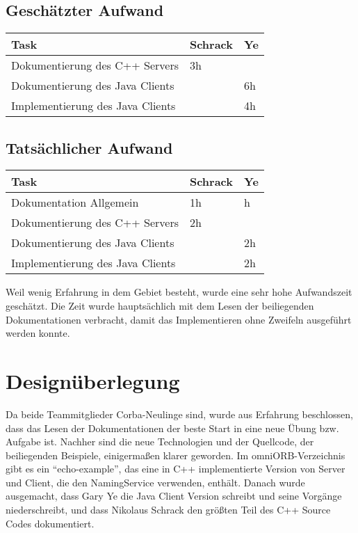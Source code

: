 \documentclass[11pt]{article}
\begin{document}
\subsection{Geschätzter Aufwand}

\begin{center}
  \begin{tabular}{| l | l | l |}
    \hline
    Task & Schrack & Ye \\ \hline

    Dokumentierung des C++ Servers   & 3h & \\ \hline
    Dokumentierung des Java Clients  & & 6h \\ \hline
    Implementierung des Java Clients & & 4h \\ \hline
  \end{tabular}
\end{center}

\subsection{Tatsächlicher Aufwand}
\begin{center}
  \begin{tabular}{| l | l | l |}
    \hline
    Task & Schrack & Ye \\ \hline
    Dokumentation Allgemein          & 1h & h \\ \hline
    Dokumentierung des C++ Servers   & 2h & \\ \hline
    Dokumentierung des Java Clients  & & 2h \\ \hline
    Implementierung des Java Clients & & 2h \\ \hline
  \end{tabular}
\end{center}

Weil wenig Erfahrung in dem Gebiet besteht, wurde eine sehr hohe Aufwandszeit geschätzt. Die Zeit wurde hauptsächlich mit dem Lesen der beiliegenden Dokumentationen \cite{omniorbuserguide} verbracht, damit das Implementieren ohne Zweifeln ausgeführt werden konnte.

\section{Designüberlegung}
Da beide Teammitglieder Corba-Neulinge sind, wurde aus Erfahrung beschlossen, dass das Lesen der Dokumentationen der beste Start in eine neue Übung bzw. Aufgabe ist. Nachher sind die neue Technologien und der Quellcode, der beiliegenden Beispiele, einigermaßen klarer geworden. Im omniORB-Verzeichnis gibt es ein ``echo-example'', das eine in C++ implementierte Version von Server und Client, die den NamingService verwenden, enthält. Danach wurde ausgemacht, dass Gary Ye die Java Client Version schreibt und seine Vorgänge niederschreibt, und dass Nikolaus Schrack den größten Teil des C++ Source Codes dokumentiert. 
\end{document}
